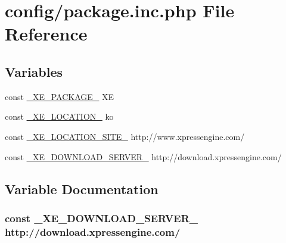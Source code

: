 \hypertarget{package_8inc_8php}{}\section{config/package.inc.\+php File Reference}
\label{package_8inc_8php}
\subsection*{Variables}
\begin{DoxyCompactItemize}
\item 
const \hyperlink{package_8inc_8php_ac4384cdc784342cd44d75952334decb4}{\+\_\+\+X\+E\+\_\+\+P\+A\+C\+K\+A\+G\+E\+\_\+} \textquotesingle{}X\+E\textquotesingle{}
\item 
const \hyperlink{package_8inc_8php_a7330debbfb3a027cdd5f3d3dd1dfbdd0}{\+\_\+\+X\+E\+\_\+\+L\+O\+C\+A\+T\+I\+O\+N\+\_\+} \textquotesingle{}ko\textquotesingle{}
\item 
const \hyperlink{package_8inc_8php_a063bfd2eb9f811b1676d0dbc0cad2648}{\+\_\+\+X\+E\+\_\+\+L\+O\+C\+A\+T\+I\+O\+N\+\_\+\+S\+I\+T\+E\+\_\+} \textquotesingle{}http\+://www.\+xpressengine.\+com/\textquotesingle{}
\item 
const \hyperlink{package_8inc_8php_a22df32d3e0eae0d60d6cddb9ec99d5ec}{\+\_\+\+X\+E\+\_\+\+D\+O\+W\+N\+L\+O\+A\+D\+\_\+\+S\+E\+R\+V\+E\+R\+\_\+} \textquotesingle{}http\+://download.\+xpressengine.\+com/\textquotesingle{}
\end{DoxyCompactItemize}


\subsection{Variable Documentation}
\hypertarget{package_8inc_8php_a22df32d3e0eae0d60d6cddb9ec99d5ec}{}
\subsubsection[{\+\_\+\+X\+E\+\_\+\+D\+O\+W\+N\+L\+O\+A\+D\+\_\+\+S\+E\+R\+V\+E\+R\+\_\+}]{\setlength{\rightskip}{0pt plus 5cm}const \+\_\+\+X\+E\+\_\+\+D\+O\+W\+N\+L\+O\+A\+D\+\_\+\+S\+E\+R\+V\+E\+R\+\_\+ \textquotesingle{}http\+://download.\+xpressengine.\+com/\textquotesingle{}}\label{package_8inc_8php_a22df32d3e0eae0d60d6cddb9ec99d5ec}


